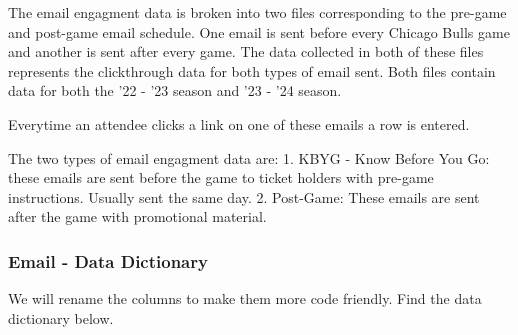 \documentclass[11pt]{article}
\begin{document}
    The email engagment data is broken into two files corresponding to the
pre-game and post-game email schedule. One email is sent before every
Chicago Bulls game and another is sent after every game. The data
collected in both of these files represents the clickthrough data for
both types of email sent. Both files contain data for both the '22 - '23
season and '23 - '24 season.

Everytime an attendee clicks a link on one of these emails a row is
entered.

The two types of email engagment data are: 1. KBYG - Know Before You Go:
these emails are sent before the game to ticket holders with pre-game
instructions. Usually sent the same day. 2. Post-Game: These emails are
sent after the game with promotional material.

\subsubsection{Email - Data Dictionary}\label{email---data-dictionary}

We will rename the columns to make them more code friendly. Find the
data dictionary below.
\end{document}
